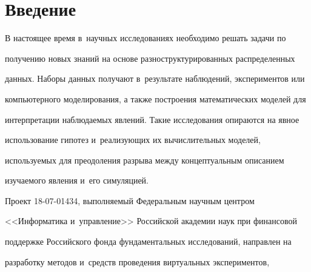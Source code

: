 














 \thispagestyle{headings}


 


 \vspace*{-12pt} 





\section{Введение}





В настоящее время в~научных исследованиях необходимо решать задачи по 


получению новых знаний на основе разноструктурированных распределенных 


данных. Наборы данных получают в~результате наблюдений, экспериментов или 


компьютерного моделирования, а также построения математических моделей для 


интерпретации наблюдаемых явлений. Такие исследования опираются на явное 


использование гипотез и~реализующих их вычислительных моделей, 


используемых для преодоления разрыва между концептуальным описанием 


изучаемого явления и~его симуляцией. 





Проект 18-07-01434, выполняемый Федеральным научным центром 


<<Информатика и~управление>> Российской академии наук при финансовой 


поддержке Российского фонда фундаментальных исследований, направлен на 


разработку методов и~средств проведения виртуальных экспериментов, 


